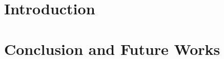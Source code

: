 \documentclass[phd,tocprelim]{cornell}
\begin{document}
\normalspacing \setcounter{page}{1} 
\pagestyle{cornell} \addtolength{\parskip}{0.5\baselineskip}

\chapter{Introduction}






\chapter{Conclusion and Future Works}


\end{document}
